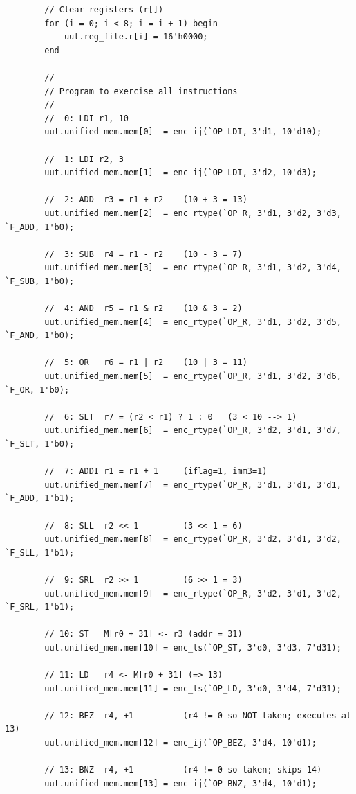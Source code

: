 \documentclass[12pt]{report}
\begin{document}
\begin{lstlisting}
        // Clear registers (r[])
        for (i = 0; i < 8; i = i + 1) begin
            uut.reg_file.r[i] = 16'h0000;
        end

        // ----------------------------------------------------
        // Program to exercise all instructions
        // ----------------------------------------------------
        //  0: LDI r1, 10
        uut.unified_mem.mem[0]  = enc_ij(`OP_LDI, 3'd1, 10'd10);

        //  1: LDI r2, 3
        uut.unified_mem.mem[1]  = enc_ij(`OP_LDI, 3'd2, 10'd3);

        //  2: ADD  r3 = r1 + r2    (10 + 3 = 13)
        uut.unified_mem.mem[2]  = enc_rtype(`OP_R, 3'd1, 3'd2, 3'd3, `F_ADD, 1'b0);

        //  3: SUB  r4 = r1 - r2    (10 - 3 = 7)
        uut.unified_mem.mem[3]  = enc_rtype(`OP_R, 3'd1, 3'd2, 3'd4, `F_SUB, 1'b0);

        //  4: AND  r5 = r1 & r2    (10 & 3 = 2)
        uut.unified_mem.mem[4]  = enc_rtype(`OP_R, 3'd1, 3'd2, 3'd5, `F_AND, 1'b0);

        //  5: OR   r6 = r1 | r2    (10 | 3 = 11)
        uut.unified_mem.mem[5]  = enc_rtype(`OP_R, 3'd1, 3'd2, 3'd6, `F_OR, 1'b0);

        //  6: SLT  r7 = (r2 < r1) ? 1 : 0   (3 < 10 --> 1)
        uut.unified_mem.mem[6]  = enc_rtype(`OP_R, 3'd2, 3'd1, 3'd7, `F_SLT, 1'b0);

        //  7: ADDI r1 = r1 + 1     (iflag=1, imm3=1)
        uut.unified_mem.mem[7]  = enc_rtype(`OP_R, 3'd1, 3'd1, 3'd1, `F_ADD, 1'b1);

        //  8: SLL  r2 << 1         (3 << 1 = 6)
        uut.unified_mem.mem[8]  = enc_rtype(`OP_R, 3'd2, 3'd1, 3'd2, `F_SLL, 1'b1);

        //  9: SRL  r2 >> 1         (6 >> 1 = 3)
        uut.unified_mem.mem[9]  = enc_rtype(`OP_R, 3'd2, 3'd1, 3'd2, `F_SRL, 1'b1);

        // 10: ST   M[r0 + 31] <- r3 (addr = 31)
        uut.unified_mem.mem[10] = enc_ls(`OP_ST, 3'd0, 3'd3, 7'd31);

        // 11: LD   r4 <- M[r0 + 31] (=> 13)
        uut.unified_mem.mem[11] = enc_ls(`OP_LD, 3'd0, 3'd4, 7'd31);

        // 12: BEZ  r4, +1          (r4 != 0 so NOT taken; executes at 13)
        uut.unified_mem.mem[12] = enc_ij(`OP_BEZ, 3'd4, 10'd1);

        // 13: BNZ  r4, +1          (r4 != 0 so taken; skips 14)
        uut.unified_mem.mem[13] = enc_ij(`OP_BNZ, 3'd4, 10'd1);


\end{lstlisting}
\end{document}
